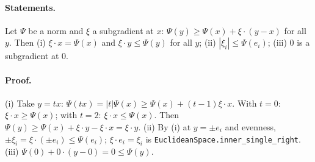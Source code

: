 \paragraph{Statements.} Let $\Psi$ be a norm and $\xi$ a subgradient at $x$:
$\Psi(y)\ge\Psi(x)+\xi\cdot(y-x)$ for all $y$. Then (i) $\xi\cdot x=\Psi(x)$ and $\xi\cdot y\le\Psi(y)$
for all $y$; (ii) $|\xi_i|\le\Psi(e_i)$; (iii) $0$ is a subgradient at $0$.
\paragraph{Proof.} (i) Take $y=tx$: $\Psi(tx)=|t|\Psi(x)\ge\Psi(x)+(t-1)\xi\cdot x$. With $t=0$:
$\xi\cdot x\ge\Psi(x)$; with $t=2$: $\xi\cdot x\le\Psi(x)$. Then
$\Psi(y)\ge\Psi(x)+\xi\cdot y-\xi\cdot x=\xi\cdot y$. (ii) By (i) at $y=\pm e_i$ and evenness,
$\pm\xi_i=\xi\cdot(\pm e_i)\le\Psi(e_i)$; $\xi\cdot e_i=\xi_i$ is
\texttt{EuclideanSpace.inner\_single\_right}. (iii) $\Psi(0)+0\cdot(y-0)=0\le\Psi(y)$.
